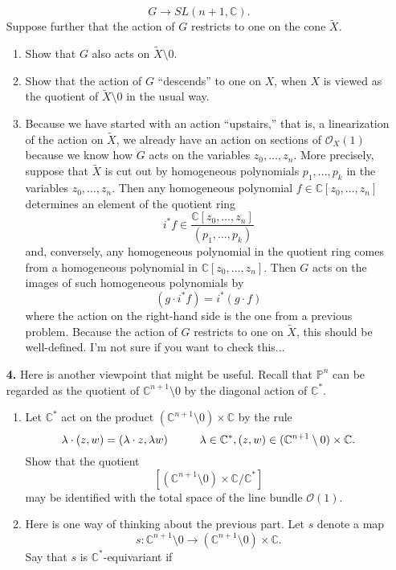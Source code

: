 \documentclass[12pt]{article}
\theoremstyle{definition}
\theoremstyle{theorem}
\begin{document}
\begin{enumerate}
\[
G \to SL(n+1, \mathbb{C}).
\] 
Suppose further that the action of $G$ restricts to one on the cone $\tilde{X}$. 
\begin{enumerate}
\item Show that $G$ also acts on $\tilde{X} \setminus 0$. 
\item Show that the action of $G$ ``descends'' to one on $X$, when $X$ is viewed as the quotient of $\tilde{X} \setminus 0$ in the usual way. 
\item Because we have started with an action ``upstairs,'' that is, a linearization of the action on $\tilde{X}$, we already have an action on sections of $\mathcal{O}_X(1)$ because we know how $G$ acts on the variables $z_0, \ldots, z_n$. More precisely, suppose that $\tilde{X}$ is cut out by homogeneous polynomials $p_1, \ldots, p_k$ in the variables $z_0, \ldots, z_n$. Then any homogeneous polynomial $f \in \mathbb{C}[z_0, \ldots, z_n]$ determines an element of the quotient ring 
\[
i^*f \in \frac{\mathbb{C}[z_0, \ldots, z_n]}{(p_1, \ldots, p_k)}
\]
and, conversely, any homogeneous polynomial in the quotient ring comes from a homogeneous polynomial in $\mathbb{C}[z_0, \ldots, z_n]$. Then $G$ acts on the images of such homogeneous polynomials by 
\[
(g \cdot i^*f) = i^* (g \cdot f)
\]
where the action on the right-hand side is the one from a previous problem. Because the action of $G$ restricts to one on $\tilde{X}$, this should be well-defined. I'm not sure if you want to check this...
\end{enumerate}
\item[\textbf{4.}] Here is another viewpoint that might be useful. Recall that $\mathbb{P}^n$ can be regarded as the quotient of $\mathbb{C}^{n+1}\setminus 0$ by the diagonal action of $\mathbb{C}^*$. 
\begin{enumerate}
\item Let $\mathbb{C}^*$ act on the product $(\mathbb{C}^{n+1}\setminus 0) \times \mathbb{C}$ by the rule 
\[
\lambda \cdot (z, w) = (\lambda \cdot z, \lambda w) \hspace{10mm} \lambda \in \mathbb{C}^*, (z,w) \in(\mathbb{C}^{n+1}\setminus 0) \times \mathbb{C}. 
\]
Show that the quotient 
\[
[(\mathbb{C}^{n+1}\setminus 0) \times \mathbb{C}/\mathbb{C}^*]
\]
may be identified with the total space of the line bundle $\mathcal{O}(1)$. 
\item Here is one way of thinking about the previous part. Let $s$ denote a map 
\[
s : \mathbb{C}^{n+1} \setminus 0 \to (\mathbb{C}^{n+1} \setminus 0) \times \mathbb{C}.
\]
Say that $s$ is $\mathbb{C}^*$-equivariant if 

\end{enumerate}
\end{enumerate}
\end{document}
